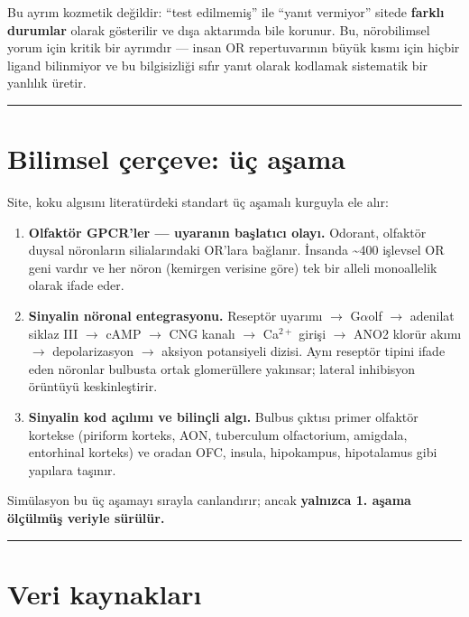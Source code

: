 \documentclass[11pt,a4paper]{article}
\begin{document}
Bu ayrım kozmetik değildir: ``test edilmemiş'' ile ``yanıt vermiyor'' sitede \textbf{farklı durumlar} olarak gösterilir ve dışa aktarımda bile korunur. Bu, nörobilimsel yorum için kritik bir ayrımdır — insan OR repertuvarının büyük kısmı için hiçbir ligand bilinmiyor ve bu bilgisizliği sıfır yanıt olarak kodlamak sistematik bir yanlılık üretir.


\vspace{0.4\baselineskip}
\hrule
\vspace{0.9\baselineskip}


\section{Bilimsel çerçeve: üç aşama}

Site, koku algısını literatürdeki standart üç aşamalı kurguyla ele alır:

\begin{enumerate}
\item \textbf{Olfaktör GPCR'ler — uyaranın başlatıcı olayı.} Odorant, olfaktör duysal nöronların silialarındaki OR'lara bağlanır. İnsanda \textasciitilde{}400 işlevsel OR geni vardır ve her nöron (kemirgen verisine göre) tek bir alleli monoallelik olarak ifade eder.
\item \textbf{Sinyalin nöronal entegrasyonu.} Reseptör uyarımı \(\rightarrow\) G\(\alpha\)olf \(\rightarrow\) adenilat siklaz III \(\rightarrow\) cAMP \(\rightarrow\) CNG kanalı \(\rightarrow\) Ca\(^{2+}\) girişi \(\rightarrow\) ANO2 klorür akımı \(\rightarrow\) depolarizasyon \(\rightarrow\) aksiyon potansiyeli dizisi. Aynı reseptör tipini ifade eden nöronlar bulbusta ortak glomerüllere yakınsar; lateral inhibisyon örüntüyü keskinleştirir.
\item \textbf{Sinyalin kod açılımı ve bilinçli algı.} Bulbus çıktısı primer olfaktör kortekse (piriform korteks, AON, tuberculum olfactorium, amigdala, entorhinal korteks) ve oradan OFC, insula, hipokampus, hipotalamus gibi yapılara taşınır.
\end{enumerate}

Simülasyon bu üç aşamayı sırayla canlandırır; ancak \textbf{yalnızca 1. aşama ölçülmüş veriyle sürülür.}


\vspace{0.4\baselineskip}
\hrule
\vspace{0.9\baselineskip}


\section{Veri kaynakları}
\end{document}
